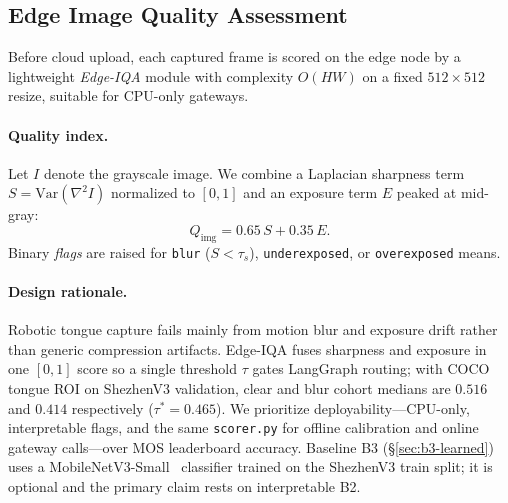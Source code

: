 \subsection{Edge Image Quality Assessment}
\label{sec:edge-iqa}

Before cloud upload, each captured frame is scored on the edge node by a lightweight \emph{Edge-IQA} module with complexity $O(HW)$ on a fixed $512\times512$ resize, suitable for CPU-only gateways.

\paragraph{Quality index.}
Let $I$ denote the grayscale image. We combine a Laplacian sharpness term $S=\mathrm{Var}(\nabla^2 I)$ normalized to $[0,1]$ and an exposure term $E$ peaked at mid-gray:
\begin{equation}
Q_{\mathrm{img}} = 0.65\, S + 0.35\, E .
\end{equation}
Binary \emph{flags} are raised for \texttt{blur} ($S<\tau_s$), \texttt{underexposed}, or \texttt{overexposed} means.

\paragraph{Design rationale.}
Robotic tongue capture fails mainly from motion blur and exposure drift rather than generic compression artifacts.
Edge-IQA fuses sharpness and exposure in one $[0,1]$ score so a single threshold $\tau$ gates LangGraph routing; with COCO tongue ROI on ShezhenV3 validation, clear and blur cohort medians are $0.516$ and $0.414$ respectively ($\tau^\ast{=}0.465$).
We prioritize deployability---CPU-only, interpretable flags, and the same \texttt{scorer.py} for offline calibration and online gateway calls---over MOS leaderboard accuracy.
Baseline B3 (\S\ref{sec:b3-learned}) uses a MobileNetV3-Small~\cite{howard2019mobilenetv3} classifier trained on the ShezhenV3 train split; it is optional and the primary claim rests on interpretable B2.

\begin{table}[t]
\centering
\caption{IQA approaches for edge acquisition gating (qualitative comparison).}
\label{tab:iqa-compare}
\small
{}
\end{table}

